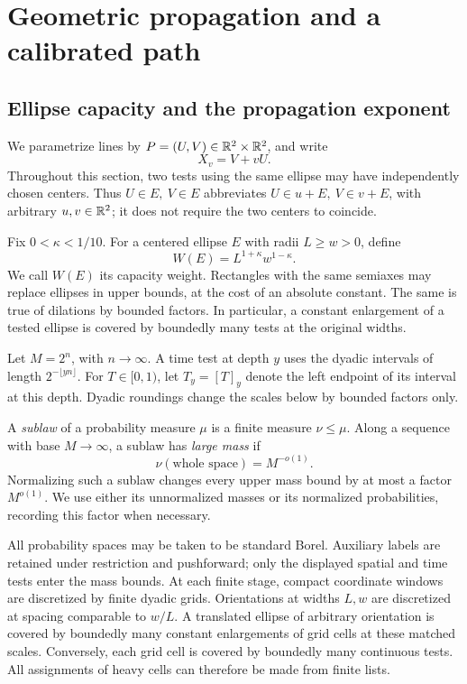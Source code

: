 \section{Geometric propagation and a calibrated path}\label{sec:geo}

\subsection{Ellipse capacity and the propagation exponent}

We parametrize lines by \(P=(U,V)\in\mathbb R^2\times\mathbb R^2\), and write
\[
X_v=V+vU.
\]
Throughout this section, two tests using the same ellipse may have
independently chosen centers.  Thus \(U\in E,\ V\in E\) abbreviates
\(U\in u+E,\ V\in v+E\), with arbitrary \(u,v\in\mathbb R^2\); it does not
require the two centers to coincide.

Fix \(0<\kappa<1/10\).  For a centered ellipse \(E\) with radii
\(L\ge w>0\), define
\[
W(E)=L^{1+\kappa}w^{1-\kappa}.
\]
We call \(W(E)\) its capacity weight.  Rectangles with the same
semiaxes may replace ellipses in upper bounds, at the cost of an
absolute constant.  The same is true of dilations by bounded factors.
In particular, a constant enlargement of a tested ellipse is covered
by boundedly many tests at the original widths.

Let \(M=2^n\), with \(n\to\infty\).  A time test at depth \(y\) uses
the dyadic intervals of length \(2^{-\lfloor yn\rfloor}\).  For
\(T\in[0,1)\), let \(T_y=[T]_y\) denote the left endpoint of its
interval at this depth.  Dyadic roundings change the scales below
by bounded factors only.

\begin{definition}\label{geo:large-sublaw}
A \emph{sublaw} of a probability measure \(\mu\) is a finite measure
\(\nu\le\mu\).  Along a sequence with base \(M\to\infty\), a sublaw
has \emph{large mass} if
\[
\nu(\text{whole space})=M^{-o(1)}.
\]
Normalizing such a sublaw changes every upper mass bound by at most
a factor \(M^{o(1)}\).  We use either its unnormalized masses or its
normalized probabilities, recording this factor when necessary.
\end{definition}

All probability spaces may be taken to be standard Borel.  Auxiliary
labels are retained under restriction and pushforward; only the
displayed spatial and time tests enter the mass bounds.  At each
finite stage, compact coordinate windows are discretized by finite
dyadic grids.  Orientations at widths \(L,w\) are discretized at
spacing comparable to \(w/L\).  A translated ellipse of arbitrary
orientation is covered by boundedly many constant enlargements of
grid cells at these matched scales.  Conversely, each grid cell is
covered by boundedly many continuous tests.  All assignments of
heavy cells can therefore be made from finite lists.

